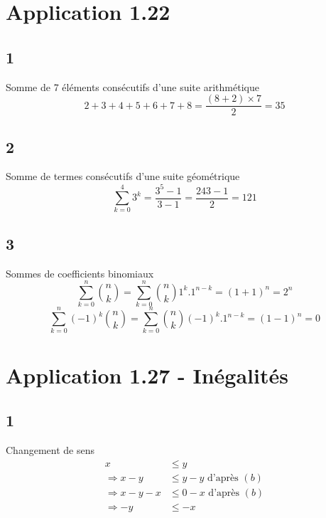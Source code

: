 \documentclass[12pt]{smfbook}
\begin{document}
\section*{Application 1.22}

\subsection*{1} Somme de 7 éléments consécutifs d'une suite arithmétique
\begin{displaymath}
	2 + 3 + 4 + 5 + 6 + 7 + 8 = \frac{(8+2)\times 7}{2} = 35
\end{displaymath}

\subsection*{2} Somme de termes consécutifs d'une suite géométrique
\begin{displaymath}
\sum_{k = 0}^{4} 3^k = \frac{3^5-1}{3-1}=\frac{243-1}{2}=121
\end{displaymath}


\subsection*{3} Sommes de coefficients binomiaux
\begin{displaymath}
	\sum_{k = 0}^{n} \binom{n}{k} = \sum_{k = 0}^{n} \binom{n}{k} 1^k . 1^{n-k} = (1+1)^n = 2^n
\end{displaymath}
\begin{displaymath}
	\sum_{k = 0}^{n} (-1)^k \binom{n}{k} = \sum_{k = 0}^{n} \binom{n}{k} (-1)^k . 1^{n-k} = (1-1)^n = 0
\end{displaymath}


\section*{Application 1.27 - Inégalités}

\subsection*{1} Changement de sens
\begin{displaymath}
	\begin{split}
                     x &\leq y \\
\Rightarrow x - y &\leq y - y   \text{ d'après $(b)$}\\
\Rightarrow x - y - x &\leq 0 - x  \text{ d'après $(b)$}\\
\Rightarrow -y& \leq -x
	\end{split}
\end{displaymath}
\end{document}
